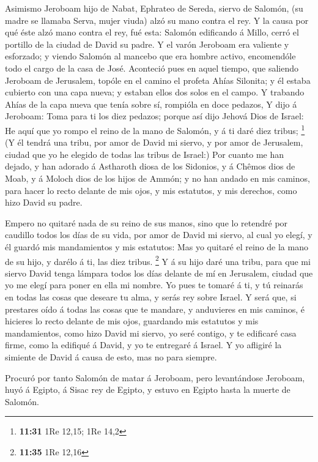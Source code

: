  Asimismo Jeroboam hijo de Nabat, Ephrateo de Sereda,
siervo de Salomón, (su madre se llamaba Serva, mujer viuda) alzó su mano
contra el rey.  Y la causa por qué éste alzó mano contra
el rey, fué esta: Salomón edificando á Millo, cerró el portillo de la
ciudad de David su padre.  Y el varón Jeroboam era
valiente y esforzado; y viendo Salomón al mancebo que era hombre activo,
encomendóle todo el cargo de la casa de José.  Aconteció
pues en aquel tiempo, que saliendo Jeroboam de Jerusalem, topóle en el
camino el profeta Ahías Silonita; y él estaba cubierto con una capa
nueva; y estaban ellos dos solos en el campo.  Y trabando
Ahías de la capa nueva que tenía sobre sí, rompióla en doce pedazos,
 Y dijo á Jeroboam: Toma para ti los diez pedazos; porque
así dijo Jehová Dios de Israel: He aquí que yo rompo el reino de la mano
de Salomón, y á ti daré diez tribus; \footnote{\textbf{11:31} 1Re 12,15;
  1Re 14,2}  (Y él tendrá una tribu, por amor de David mi
siervo, y por amor de Jerusalem, ciudad que yo he elegido de todas las
tribus de Israel:)  Por cuanto me han dejado, y han
adorado á Astharoth diosa de los Sidonios, y á Chêmos dios de Moab, y á
Moloch dios de los hijos de Ammón; y no han andado en mis caminos, para
hacer lo recto delante de mis ojos, y mis estatutos, y mis derechos,
como hizo David su padre.

 Empero no quitaré nada de su reino de sus manos, sino
que lo retendré por caudillo todos los días de su vida, por amor de
David mi siervo, al cual yo elegí, y él guardó mis mandamientos y mis
estatutos:  Mas yo quitaré el reino de la mano de su
hijo, y darélo á ti, las diez tribus. \footnote{\textbf{11:35} 1Re 12,16}
 Y á su hijo daré una tribu, para que mi siervo David
tenga lámpara todos los días delante de mí en Jerusalem, ciudad que yo
me elegí para poner en ella mi nombre.  Yo pues te tomaré
á ti, y tú reinarás en todas las cosas que deseare tu alma, y serás rey
sobre Israel.  Y será que, si prestares oído á todas las
cosas que te mandare, y anduvieres en mis caminos, é hicieres lo recto
delante de mis ojos, guardando mis estatutos y mis mandamientos, como
hizo David mi siervo, yo seré contigo, y te edificaré casa firme, como
la edifiqué á David, y yo te entregaré á Israel.  Y yo
afligiré la simiente de David á causa de esto, mas no para siempre.

 Procuró por tanto Salomón de matar á Jeroboam, pero
levantándose Jeroboam, huyó á Egipto, á Sisac rey de Egipto, y estuvo en
Egipto hasta la muerte de Salomón.

